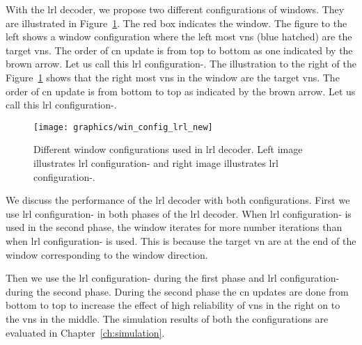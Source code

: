 With the \gls{lrl} decoder, we propose two different configurations of windows. They are illustrated in Figure~\ref{fig:win_config_lrl}. The red box indicates the window. The figure to the left shows a window configuration where the left most \glspl{vn} (blue hatched) are the target \glspl{vn}. The order of \gls{cn} update is from top to bottom as one indicated by the brown arrow. Let us call this \gls{lrl} configuration-. The illustration to the right of the Figure~\ref{fig:win_config_lrl} shows that the right most \glspl{vn} in the window are the target \glspl{vn}. The order of \gls{cn} update is from bottom to top as indicated by the brown arrow. Let us call this \gls{lrl} configuration-.

\begin{figure}[htbp]
  \centering
  \texttt{[image: graphics/win\_config\_lrl\_new]}
  \caption{Different window configurations used in \gls{lrl} decoder. Left image illustrates \gls{lrl} configuration- and right image illustrates \gls{lrl} configuration-.}
  \label{fig:win_config_lrl}
\end{figure}

We discuss the performance of the \gls{lrl} decoder with both configurations. First we use \gls{lrl} configuration- in both phases of the \gls{lrl} decoder. When \gls{lrl} configuration- is used in the second phase, the window iterates for more number iterations than when \gls{lrl} configuration- is used. This is because the target \gls{vn} are at the end of the window corresponding to the window direction.

Then we use the \gls{lrl} configuration- during the first phase and \gls{lrl} configuration- during the second phase. During the second phase the \gls{cn} updates are done from bottom to top to increase the effect of high reliability of \glspl{vn} in the right on to the \glspl{vn} in the middle. The simulation results of both the configurations are evaluated in Chapter~\ref{ch:simulation}.

